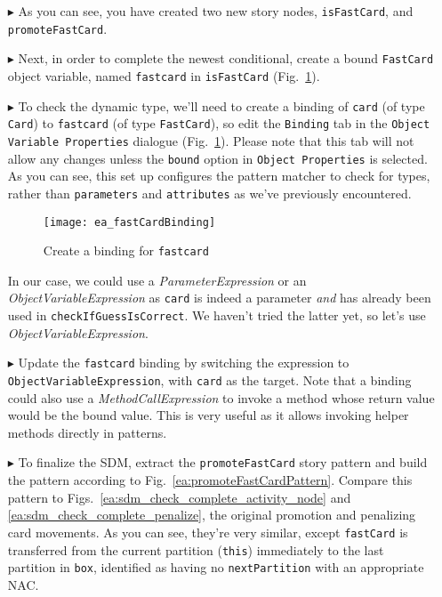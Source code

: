 \begin{itemize}
\item[$\blacktriangleright$] As you can see, you have created two new story nodes, \texttt{isFastCard}, and \texttt{promoteFastCard}.
 
\item[$\blacktriangleright$] Next, in order to complete the newest conditional, create a bound \texttt{FastCard} object variable, named \texttt{fastcard} in
\texttt{isFastCard} (Fig.~\ref{ea:fastCardBinding}).
 
\item[$\blacktriangleright$] To check the dynamic type, we'll need to create a binding of \texttt{card} (of type \texttt{Card}) to \texttt{fastcard} (of
type \texttt{FastCard}), so edit the \texttt{Binding} tab in the \texttt{Object Variable Properties} dialogue (Fig.~\ref{ea:fastCardBinding}). Please note that
this tab will not allow any changes unless the \texttt{bound} option in \texttt{Object Properties} is selected. As you can see, this set up configures the
pattern matcher to check for types, rather than \texttt{parameters} and \texttt{attributes} as we've previously encountered.

\vspace{0.5cm}

\begin{figure}[htbp]
\begin{center}
  \texttt{[image: ea\_fastCardBinding]}
  \caption{Create a binding for \texttt{fastcard}}  
  \label{ea:fastCardBinding}
\end{center}
\end{figure}

\clearpage

In our case, we could use a \emph{ParameterExpression} or an \emph{ObjectVariableExpression} as \texttt{card} is indeed a
parameter \emph{and} has already been used in \texttt{checkIfGuessIsCorrect}. We haven't tried the latter yet, so let's use \emph{ObjectVariableExpression}.

\item[$\blacktriangleright$] Update the \texttt{fastcard} binding by switching the expression to 
\texttt{Object\-Vari\-able\-Ex\-pres\-sion}, with \texttt{card} as the target. Note that a binding could also use a \emph{MethodCallExpression} to invoke a
method whose return value would be the bound value. This is very useful as it allows invoking helper methods directly in patterns.

\item[$\blacktriangleright$] To finalize the SDM, extract the \texttt{promoteFastCard} story pattern and build the pattern according to
Fig.~\ref{ea:promoteFastCardPattern}. Compare this pattern to Figs.~\ref{ea:sdm_check_complete_activity_node} and \ref{ea:sdm_check_complete_penalize}, the
original promotion and penalizing card movements. As you can see, they're very similar, except \texttt{fastCard} is transferred from the current partition
(\texttt{this}) immediately to the last partition in \texttt{box}, identified as having no \texttt{nextPartition} with an appropriate NAC.


\end{itemize}
